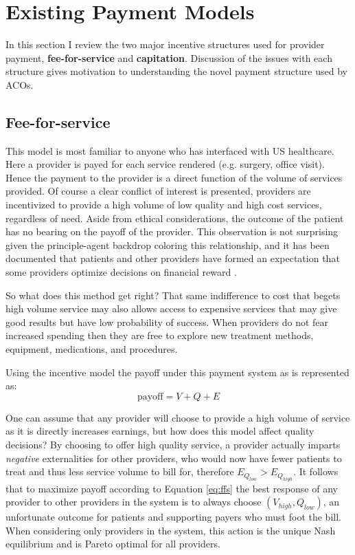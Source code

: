 \documentclass{article}
\begin{document}
\section{Existing Payment Models}
In this section I review the two major incentive structures used for provider payment, \textbf{fee-for-service} and \textbf{capitation}. Discussion of the issues with each structure gives motivation to understanding the novel payment structure used by ACOs.

\subsection{Fee-for-service}
This model is most familiar to anyone who has interfaced with US healthcare. Here a provider is payed for each service rendered (e.g. surgery, office visit). Hence the payment to the provider is a direct function of the volume of services provided. Of course a clear conflict of interest is presented, providers are incentivized to provide a high volume of low quality and high cost services, regardless of need. Aside from ethical considerations, the outcome of the patient has no bearing on the payoff of the provider. This observation is not surprising given the principle-agent backdrop coloring this relationship, and it has been documented that patients and other providers have formed an expectation that some providers optimize decisions on financial reward \cite{econharvard}\cite{overtreat}.

So what does this method get right? That same indifference to cost that begets high volume service may also allows access to expensive services that may give good results but have low probability of success. When providers do not fear increased spending then they are free to explore new treatment methods, equipment, medications, and procedures.

Using the incentive model the payoff under this payment system as is represented as:
\begin{equation} \label{eq:ffs}
    \text{payoff} = V + Q + E
\end{equation}

One can assume that any provider will choose to provide a high volume of service as it is directly increases earnings, but how does this model affect quality decisions? By choosing to offer high quality service, a provider actually imparts \emph{negative} externalities for other providers, who would now have fewer patients to treat and thus less service volume to bill for, therefore $E_{Q_{low}} > E_{Q_{high}}$. It follows that to maximize payoff according to Equation \ref{eq:ffs} the best response of any provider to other providers in the system is to always choose $(V_{high}, Q_{low})$, an unfortunate outcome for patients and supporting payers who must foot the bill. When considering only providers in the system, this action is the unique Nash equilibrium \cite{blended} and is Pareto optimal for all providers.
\end{document}

